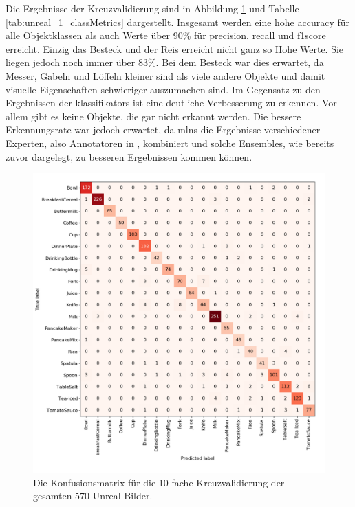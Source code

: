 Die Ergebnisse der Kreuzvalidierung sind in Abbildung \ref{fig:unreal_1_confMatrix} und Tabelle \ref{tab:unreal_1_classMetrics} dargestellt. Insgesamt werden eine hohe \gls{accuracy} für alle Objektklassen als auch Werte über 90\% für \gls{precision}, \gls{recall} und \gls{f1score} erreicht. Einzig das Besteck und der Reis erreicht nicht ganz so Hohe Werte. Sie liegen jedoch noch immer über 83\%. Bei dem Besteck war dies erwartet, da Messer, Gabeln und Löffeln kleiner sind als viele andere Objekte und damit visuelle Eigenschaften schwieriger auszumachen sind. Im Gegensatz zu den Ergebnissen der \glspl{klassifikator} ist eine deutliche Verbesserung zu erkennen. Vor allem gibt es keine Objekte, die gar nicht erkannt werden. Die bessere Erkennungsrate war jedoch erwartet, da \glspl{mln} die Ergebnisse verschiedener Experten, also Annotatoren in \robosherlock, kombiniert und solche Ensembles, wie bereits zuvor dargelegt, zu besseren Ergebnissen kommen können.     

\begin{figure}
	\includegraphics[scale=.5]{img/chapter6/unrealEx1_cof_matrix.png}
\caption[Konfusionsmatrix des gesamten Unreal-Bilder Datensatzes]{Die Konfusionsmatrix für die 10-fache Kreuzvalidierung der gesamten 570 Unreal-Bilder.}
\label{fig:unreal_1_confMatrix}
\end{figure}

